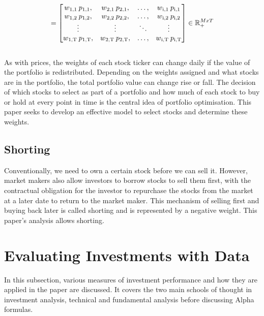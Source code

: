 \documentclass[a4paper,12pt]{report}
\numberwithin{equation}{section}
\theoremstyle{definition}
\begin{document}
\begin{equation*}
= 
  \begin{bmatrix}
    w\textsubscript{1,1}\:p\textsubscript{1,1},&
    w\textsubscript{2,1}\:p\textsubscript{2,1},&
    \ldots,&
    w\textsubscript{i,1}\:p\textsubscript{i,1} 
    \\
    w\textsubscript{1,2}\:p\textsubscript{1,2},&
    w\textsubscript{2,2}\:p\textsubscript{2,2},&
    \ldots,&
    w\textsubscript{i,2}\:p\textsubscript{i,2}
    \\
    \vdots&\vdots&\ddots&\vdots
    \\
    w\textsubscript{1,T}\:p\textsubscript{1,T},&
    w\textsubscript{2,T}\:p\textsubscript{2,T},&
    \ldots,&
    w\textsubscript{i,T}\:p\textsubscript{i,T}
  \end{bmatrix}
  \in \mathbb{R}_+^{M x T}
\end{equation*}
\\
As with prices, the weights of each stock ticker can change daily if the value of the portfolio is redistributed. Depending on the weights assigned and what stocks are in the portfolio, the total portfolio value can change rise or fall. The decision of which stocks to select as part of a portfolio and how much of each stock to buy or hold at every point in time is the central idea of portfolio optimisation. This paper seeks to develop an effective model to select stocks and determine these weights.

\subsection{Shorting}
Conventionally, we need to own a certain stock before we can sell it. However, market makers also allow investors to borrow stocks to sell them first, with the contractual obligation for the investor to repurchase the stocks from the market at a later date to return to the market maker. This mechanism of selling first and buying back later is called shorting and is represented by a negative weight. This paper's analysis allows shorting.


\section{Evaluating Investments with Data}
In this subsection, various measures of investment performance and how they are applied in the paper are discussed. It covers the two main schools of thought in investment analysis, technical and fundamental analysis before discussing Alpha formulas.
\end{document}
